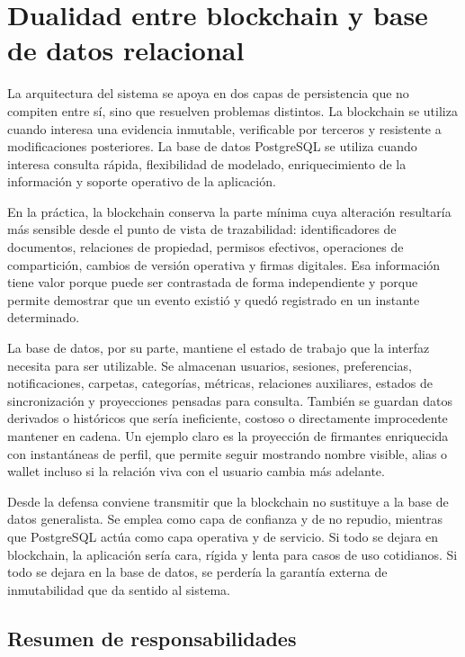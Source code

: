 \documentclass[11pt, a4paper]{article}
\begin{document}
\section{Dualidad entre blockchain y base de datos relacional}

La arquitectura del sistema se apoya en dos capas de persistencia que no compiten entre sí, sino que resuelven problemas distintos. La blockchain se utiliza cuando interesa una evidencia inmutable, verificable por terceros y resistente a modificaciones posteriores. La base de datos PostgreSQL se utiliza cuando interesa consulta rápida, flexibilidad de modelado, enriquecimiento de la información y soporte operativo de la aplicación.

En la práctica, la blockchain conserva la parte mínima cuya alteración resultaría más sensible desde el punto de vista de trazabilidad: identificadores de documentos, relaciones de propiedad, permisos efectivos, operaciones de compartición, cambios de versión operativa y firmas digitales. Esa información tiene valor porque puede ser contrastada de forma independiente y porque permite demostrar que un evento existió y quedó registrado en un instante determinado.

La base de datos, por su parte, mantiene el estado de trabajo que la interfaz necesita para ser utilizable. Se almacenan usuarios, sesiones, preferencias, notificaciones, carpetas, categorías, métricas, relaciones auxiliares, estados de sincronización y proyecciones pensadas para consulta. También se guardan datos derivados o históricos que sería ineficiente, costoso o directamente improcedente mantener en cadena. Un ejemplo claro es la proyección de firmantes enriquecida con instantáneas de perfil, que permite seguir mostrando nombre visible, alias o wallet incluso si la relación viva con el usuario cambia más adelante.

Desde la defensa conviene transmitir que la blockchain no sustituye a la base de datos generalista. Se emplea como capa de confianza y de no repudio, mientras que PostgreSQL actúa como capa operativa y de servicio. Si todo se dejara en blockchain, la aplicación sería cara, rígida y lenta para casos de uso cotidianos. Si todo se dejara en la base de datos, se perdería la garantía externa de inmutabilidad que da sentido al sistema.

\subsection{Resumen de responsabilidades}
\end{document}
